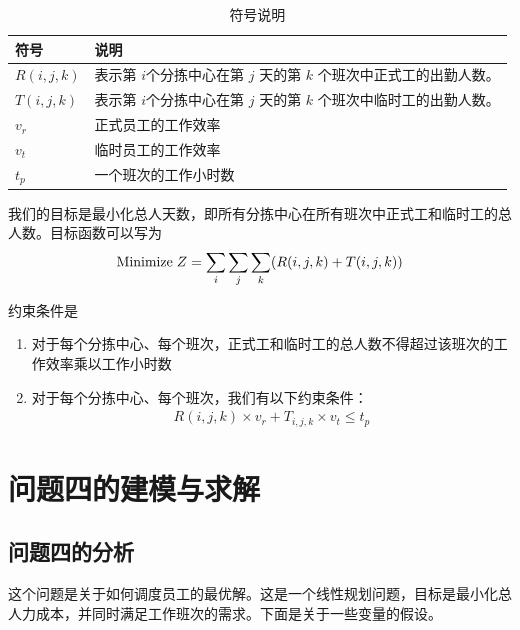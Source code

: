 \documentclass[UTF8,a4paper,10 pt]{article}%
\begin{document}
\begin{table}[!ht]
\caption{符号说明}%
\centering%
\begin{tabular}{p{3cm}<{\centering}p{11cm}<{\centering}}%
\toprule%
符号&说明 \\
\midrule%
$R(i,j,k)$&表示第 \(i\)个分拣中心在第 
$j$ 天的第 
$k$ 个班次中正式工的出勤人数。\\
$T(i,j,k)$&表示第 \(i\)个分拣中心在第 
$j$ 天的第 
$k$ 个班次中临时工的出勤人数。\\
\(v_r\)&正式员工的工作效率\\ 
\(v_t\)&临时员工的工作效率\\ 
\(t_p\)&一个班次的工作小时数\\
\bottomrule%
\end{tabular}
\end{table}
我们的目标是最小化总人天数，即所有分拣中心在所有班次中正式工和临时工的总人数。目标函数可以写为
\begin{align*}
    {\rm Minimize\;}Z = \sum_{i}\sum_{j}\sum_{k}(R(i,j,k)+T(i,j,k))
\end{align*}

约束条件是
\begin{enumerate}
    \item 对于每个分拣中心、每个班次，正式工和临时工的总人数不得超过该班次的工作效率乘以工作小时数
    \item 对于每个分拣中心、每个班次，我们有以下约束条件：\begin{align*}
        R(i,j,k) \times v_r + T_{i,j,k} \times v_t \leq t_p
    \end{align*}
\end{enumerate}




\section{问题四的建模与求解}

\subsection{问题四的分析}

这个问题是关于如何调度员工的最优解。这是一个线性规划问题，目标是最小化总人力成本，并同时满足工作班次的需求。下面是关于一些变量的假设。
\end{document}
